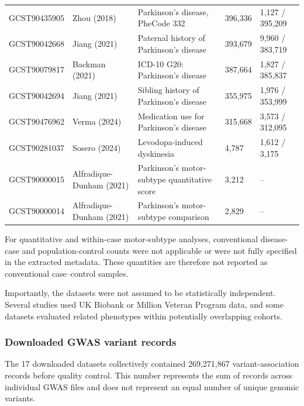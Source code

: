 \documentclass[11pt,a4paper]{article}
\begin{document}
\begin{longtable}{@{}p{2.15cm}p{2.75cm}p{4.15cm}p{2.15cm}p{2.8cm}@{}}
GCST90435905 &
Zhou (2018) &
Parkinson's disease, PheCode 332 &
396,336 & 1,127 / 395,209 \\

GCST90042668 &
Jiang (2021) &
Paternal history of Parkinson's disease &
393,679 & 9,960 / 383,719 \\

GCST90079817 &
Backman (2021) &
ICD-10 G20: Parkinson's disease &
387,664 & 1,827 / 385,837 \\

GCST90042694 &
Jiang (2021) &
Sibling history of Parkinson's disease &
355,975 & 1,976 / 353,999 \\

GCST90476962 &
Verma (2024) &
Medication use for Parkinson's disease &
315,668 & 3,573 / 312,095 \\

GCST90281037 &
Sosero (2024) &
Levodopa-induced dyskinesia &
4,787 & 1,612 / 3,175 \\

GCST90000015 &
Alfradique-Dunham (2021) &
Parkinson's motor-subtype quantitative score &
3,212 & -- \\

GCST90000014 &
Alfradique-Dunham (2021) &
Parkinson's motor-subtype comparison &
2,829 & -- \\

\end{longtable}
\endgroup

For quantitative and within-case motor-subtype
analyses, conventional disease-case and population-control
counts were not applicable or were not fully specified
in the extracted metadata. These quantities are therefore
not reported as conventional case--control samples.

Importantly, the datasets were not assumed to be
statistically independent. Several studies used UK
Biobank or Million Veteran Program data, and some
datasets evaluated related phenotypes within potentially
overlapping cohorts.

\subsubsection{Downloaded GWAS variant records}

The 17 downloaded datasets collectively contained
269,271,867 variant-association records before quality
control. This number represents the sum of records across
individual GWAS files and does not represent an equal
number of unique genomic variants.
\end{document}

